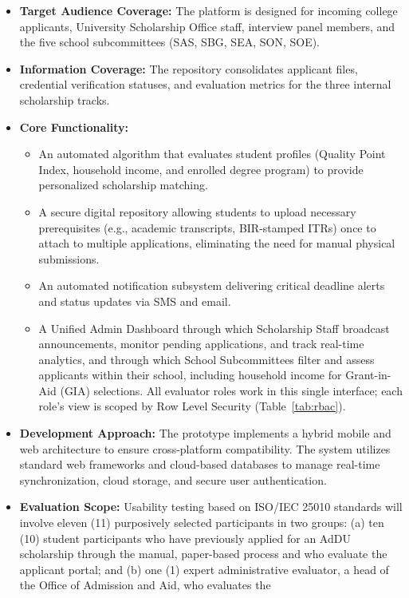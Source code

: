 \begin{itemize}
  \item \textbf{Target Audience Coverage:} The platform is designed for incoming college applicants, University Scholarship Office staff, interview panel members, and the five school subcommittees (SAS, SBG, SEA, SON, SOE).
  \item \textbf{Information Coverage:} The repository consolidates applicant files, credential verification statuses, and evaluation metrics for the three internal scholarship tracks.
  \item \textbf{Core Functionality:}
  \begin{itemize}
    \item An automated algorithm that evaluates student profiles (Quality Point Index, household income, and enrolled degree program) to provide personalized scholarship matching.
    \item A secure digital repository allowing students to upload necessary prerequisites (e.g., academic transcripts, BIR-stamped ITRs) once to attach to multiple applications, eliminating the need for manual physical submissions.
    \item An automated notification subsystem delivering critical deadline alerts and status updates via SMS and email.
    \item A Unified Admin Dashboard through which Scholarship Staff broadcast announcements, monitor pending applications, and track real-time analytics, and through which School Subcommittees filter and assess applicants within their school, including household income for Grant-in-Aid (GIA) selections. All evaluator roles work in this single interface; each role's view is scoped by Row Level Security (Table~\ref{tab:rbac}).
  \end{itemize}
  \item \textbf{Development Approach:} The prototype implements a hybrid mobile and web architecture to ensure cross-platform compatibility. The system utilizes standard web frameworks and cloud-based databases to manage real-time synchronization, cloud storage, and secure user authentication.
  \item \textbf{Evaluation Scope:} Usability testing based on ISO/IEC 25010
standards will involve eleven (11) purposively selected participants in
two groups: (a) ten (10) student participants who have previously applied
for an AdDU scholarship through the manual, paper-based process and who
evaluate the applicant portal; and (b) one (1) expert administrative
evaluator, a head of the Office of Admission and Aid, who evaluates the

\end{itemize}
